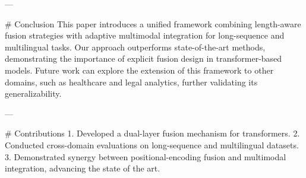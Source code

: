 ---

# Conclusion  
This paper introduces a unified framework combining length-aware fusion strategies with adaptive multimodal integration for long-sequence and multilingual tasks. Our approach outperforms state-of-the-art methods, demonstrating the importance of explicit fusion design in transformer-based models. Future work can explore the extension of this framework to other domains, such as healthcare and legal analytics, further validating its generalizability.

---

# Contributions  
1. Developed a dual-layer fusion mechanism for transformers.
2. Conducted cross-domain evaluations on long-sequence and multilingual datasets.
3. Demonstrated synergy between positional-encoding fusion and multimodal integration, advancing the state of the art.